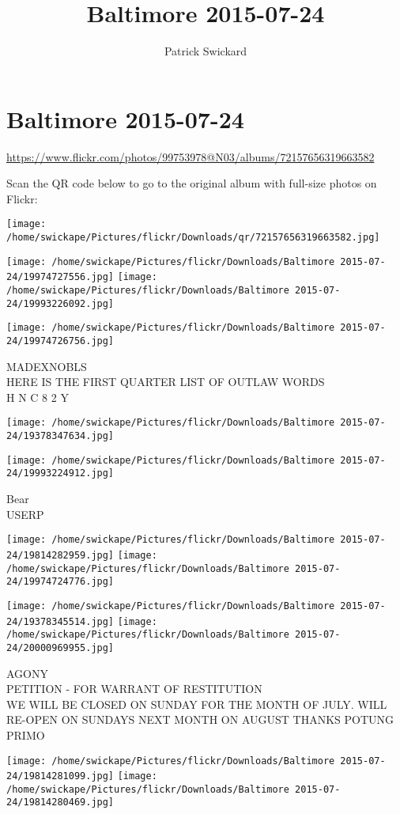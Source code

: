 \documentclass[10pt,letterpaper]{article}
\title{Baltimore 2015-07-24}
\author{Patrick Swickard}
\date{}
\begin{document}
\section*{Baltimore 2015-07-24}

\url{https://www.flickr.com/photos/99753978@N03/albums/72157656319663582}

Scan the QR code below to go to the original album with full-size photos on Flickr:

\texttt{[image: /home/swickape/Pictures/flickr/Downloads/qr/72157656319663582.jpg]}
\pagebreak

\texttt{[image: /home/swickape/Pictures/flickr/Downloads/Baltimore 2015-07-24/19974727556.jpg]}
\texttt{[image: /home/swickape/Pictures/flickr/Downloads/Baltimore 2015-07-24/19993226092.jpg]}

\texttt{[image: /home/swickape/Pictures/flickr/Downloads/Baltimore 2015-07-24/19974726756.jpg]}

MADEXNOBLS\\
HERE IS THE FIRST QUARTER LIST OF OUTLAW WORDS\\
H N C 8 2 Y
\pagebreak

\texttt{[image: /home/swickape/Pictures/flickr/Downloads/Baltimore 2015-07-24/19378347634.jpg]}

\vspace{0.25in}
\texttt{[image: /home/swickape/Pictures/flickr/Downloads/Baltimore 2015-07-24/19993224912.jpg]}

Bear\\
USERP
\pagebreak

\texttt{[image: /home/swickape/Pictures/flickr/Downloads/Baltimore 2015-07-24/19814282959.jpg]}
\texttt{[image: /home/swickape/Pictures/flickr/Downloads/Baltimore 2015-07-24/19974724776.jpg]}

\texttt{[image: /home/swickape/Pictures/flickr/Downloads/Baltimore 2015-07-24/19378345514.jpg]}
\texttt{[image: /home/swickape/Pictures/flickr/Downloads/Baltimore 2015-07-24/20000969955.jpg]}

AGONY\\
PETITION {-} FOR WARRANT OF RESTITUTION\\
WE WILL BE CLOSED ON SUNDAY FOR THE MONTH OF JULY.  WILL RE{-}OPEN ON SUNDAYS NEXT MONTH ON AUGUST THANKS POTUNG\\
PRIMO
\pagebreak

\texttt{[image: /home/swickape/Pictures/flickr/Downloads/Baltimore 2015-07-24/19814281099.jpg]}
\texttt{[image: /home/swickape/Pictures/flickr/Downloads/Baltimore 2015-07-24/19814280469.jpg]}
\end{document}
